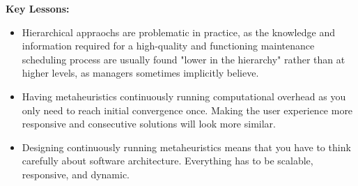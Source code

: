 \textbf{Key Lessons:}
\begin{itemize}
	\item Hierarchical appraochs are problematic in practice, as the knowledge and information required for a high-quality and functioning maintenance 
		  scheduling process are usually found "lower in the hierarchy" rather than at higher levels, as managers sometimes implicitly believe.
	\item Having metaheuristics continuously running computational overhead as you only need to reach initial convergence once. Making the 
	      user experience more responsive and consecutive solutions will look more similar.
	\item Designing continuously running metaheuristics means that you have to think carefully about software architecture. Everything has to
		  be scalable, responsive, and dynamic. 
\end{itemize}

